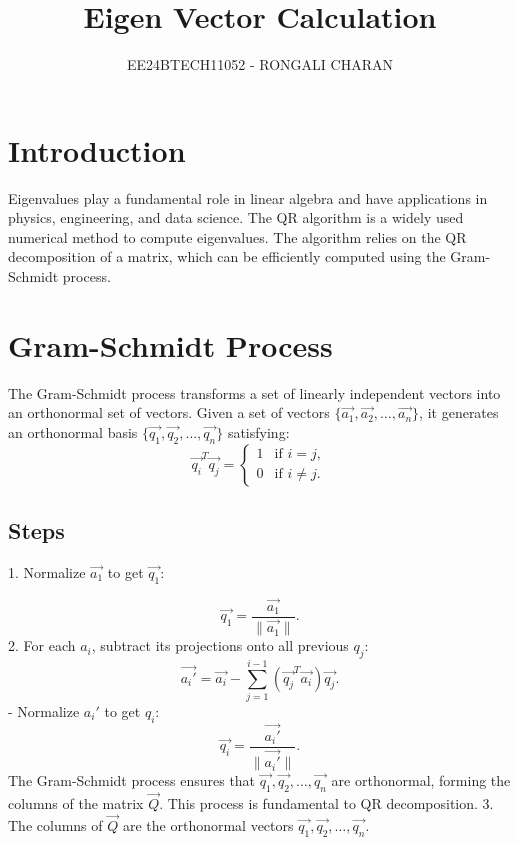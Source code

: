 \documentclass[journal,12pt,onecolumn]{IEEEtran}
\theoremstyle{remark}
\begin{document}

\vspace{3cm}
\title{Eigen Vector Calculation}
\author{EE24BTECH11052 - RONGALI CHARAN}
{\let\newpage\relax\maketitle}

\renewcommand{\thefigure}{\theenumi}
\renewcommand{\thetable}{\theenumi}
\setlength{\intextsep}{10pt} %


\renewcommand{\thetable}{\theenumi}
\tableofcontents

\section{Introduction}
Eigenvalues play a fundamental role in linear algebra and have applications in physics, engineering, and data science. The QR algorithm is a widely used numerical method to compute eigenvalues. The algorithm relies on the QR decomposition of a matrix, which can be efficiently computed using the Gram-Schmidt process.
\section{Gram-Schmidt Process}
The Gram-Schmidt process transforms a set of linearly independent vectors into an orthonormal set of vectors. Given a set of vectors $\{\vec{a_1},\vec{ a_2}, \dots, \vec{a_n}\}$, it generates an orthonormal basis $\{\vec{q_1},\vec{q_2}, \dots, \vec{q_n}\}$ satisfying:
$$
\vec{q_i}^T \vec{q_j} = 
\begin{cases} 
1 & \text{if } i = j, \\
0 & \text{if } i \neq j.
\end{cases}
$$
\subsection{Steps}
1. Normalize $\vec{a_1}$ to get $\vec{q_1}$:

$$\vec{q_1} = \frac{\vec{a_1}}{\|\vec{a_1}\|}.$$
2. For each $a_i$, subtract its projections onto all previous $q_j$:
   $$
   \vec{a_i'} = \vec{a_i} - \sum_{j=1}^{i-1} (\vec{q_j}^T \vec{a_i}) \vec{q_j}.
   $$
   - Normalize $a_i'$ to get $q_i$:
   $$
   \vec{q_i} = \frac{\vec{a_i'}}{\|\vec{a_i'}\|}.
   $$
   The Gram-Schmidt process ensures that $\vec{q_1}, \vec{q_2}, \dots, \vec{q_n}$ are orthonormal, forming the columns of the matrix $\vec{Q}$. This process is fundamental to QR decomposition.
3.  The columns of $\vec{Q}$ are the orthonormal vectors $ \vec{q_1}, \vec{q_2}, \dots, \vec{q_n} $.
\end{document}
